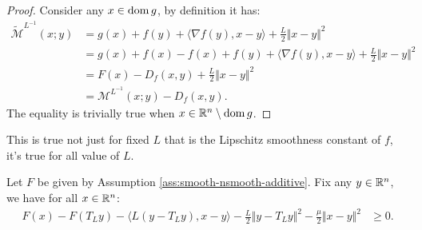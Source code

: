 \documentclass[12pt]{article}
\begin{document}
    \begin{proof}
        Consider any $x \in \operatorname{dom} g$, by definition it has: 
        \begin{align*}
            \widetilde{\mathcal M}^{L^{-1}}(x; y) 
            &= 
            g(x) + f(y) + \langle \nabla f(y), x - y\rangle + \frac{L}{2}\Vert x - y\Vert^2
            \\
            &= 
            g(x) + f(x) - f(x) + f(y) 
            + \langle \nabla f(y), x - y\rangle + \frac{L}{2}\Vert x - y\Vert^2
            \\
            &= 
            F(x) - D_f(x, y) + \frac{L}{2}\Vert x - y\Vert^2 
            \\
            &= \mathcal M^{L^{-1}}(x; y) - D_f(x, y). 
        \end{align*}
        The equality is trivially true when $x \in \mathbb R^n \setminus \operatorname{dom} g$. 
    \end{proof}
    \begin{remark}
        This is true not just for fixed $L$ that is the Lipschitz smoothness constant of $f$, it's true for all value of $L$. 
    \end{remark}
    \begin{theorem}\label{thm:prox-grad-ineq}
        Let $F$ be given by Assumption \ref{ass:smooth-nsmooth-additive}. 
        Fix any $y\in \mathbb R^n$, we have for all $x \in \mathbb R^n$: 
        \begin{align*}
            F(x) - F(T_Ly) - \langle L(y - T_Ly), x - y\rangle
            - \frac{L}{2}\Vert y - T_L y\Vert^2
            - \frac{\mu}{2}\Vert x - y\Vert^2
            &\ge  
            0.
        \end{align*}
    \end{theorem}
\end{document}
